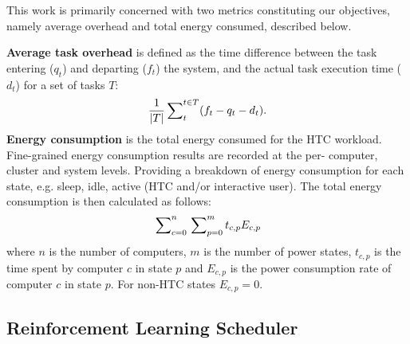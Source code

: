 \documentclass[10pt, conference, compsocconf]{IEEEtran}
\begin{document}
This work is primarily concerned with two metrics constituting our objectives, namely average overhead and total energy consumed, described below.

\textbf{Average task overhead} is defined as the time difference between the task entering ($q_t$) and departing ($f_t$) the system, and the actual task execution time ($d_t$) for a set of tasks $T$:%
\begin{equation*}
\frac{1}{|T|}
\sideset{}{^{t \in T}_{t}}\sum (f_{t} - q_{t} - d_{t}).
	\end{equation*}
\textbf{Energy consumption} is the total energy consumed for the HTC workload. Fine-grained energy consumption results are recorded at the per- computer, cluster and system levels. Providing a breakdown of energy consumption for each state, e.g. sleep, idle, active (HTC and/or interactive user). The total energy consumption is then calculated as follows:
\begin{equation}
\sideset{}{^n_{c=0}}\sum \sideset{}{^m_{p=0}}\sum t_{c,p} E_{c,p}
\end{equation}
\noindent where $n$ is the number of computers, $m$ is the number of power states, $t_{c,p}$ is the time spent by computer $c$ in state $p$ and $E_{c,p}$ is the power consumption rate of computer $c$ in state $p$. For non-HTC states $E_{c,p} = 0$.





\subsection{Reinforcement Learning Scheduler}
\end{document}
